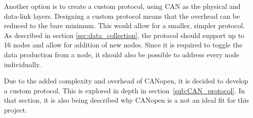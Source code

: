 Another option is to create a custom protocol, using CAN as the physical and data-link layers.
Designing a custom protocol means that the overhead can be reduced to the bare minimum.
This would allow for a smaller, simpler protocol.
As described in section \ref{sec:data_collection}, the protocol should support up to 16 nodes and allow for addition of new nodes.
Since it is required to toggle the data production from a node, it should also be possible to address every node individually.

Due to the added complexity and overhead of CANopen, it is decided to develop a custom protocol. 
This is explored in depth in section~\ref{sub:CAN_protocol}.
In that section, it is also being described why CANopen is a not an ideal fit for this project.
